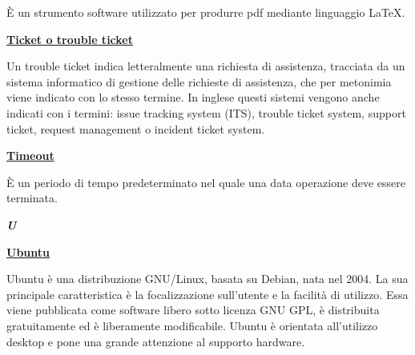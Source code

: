\medskip
\begin{addmargin}[5em]{1em}	
È un strumento software utilizzato per produrre pdf mediante linguaggio \LaTeX{}.
\end{addmargin}

\bigskip
\begin{addmargin}[0em]{0em}		
	\textbf{\underline{Ticket o trouble ticket}}
\end{addmargin}
	
\medskip
\begin{addmargin}[5em]{1em}	 
Un trouble ticket indica letteralmente una richiesta di assistenza, tracciata da un sistema informatico di gestione delle richieste di assistenza, che per metonimia viene indicato con lo stesso termine.
In inglese questi sistemi vengono anche indicati con i termini: issue tracking system (ITS), trouble ticket system, support ticket, request management o incident ticket system.
\end{addmargin}

\bigskip
\begin{addmargin}[0em]{0em}	
	\textbf{\underline{Timeout}}
\end{addmargin}

\medskip
\begin{addmargin}[5em]{1em}
È un periodo di tempo predeterminato nel quale una data operazione deve essere terminata.
\end{addmargin}

\newpage

\cleardoublepage
{}
{}
\noindent\hrulefill\hspace{4mm}\textbf{\textsl{\Huge{U}}}\hspace{4mm}\hrulefill
\vspace*{2\bigskipamount}	

\begin{addmargin}[0em]{0em}
	\textbf{\underline{Ubuntu}}
\end{addmargin}

\medskip
\begin{addmargin}[5em]{1em}
Ubuntu è una distribuzione GNU/Linux, basata su Debian, nata nel 2004. La sua principale caratteristica è la focalizzazione sull'utente e la facilità di utilizzo. Essa viene pubblicata come software libero sotto licenza GNU GPL, è distribuita gratuitamente ed è liberamente modificabile. Ubuntu è orientata all'utilizzo desktop e pone una grande attenzione al supporto hardware.
\end{addmargin}	

